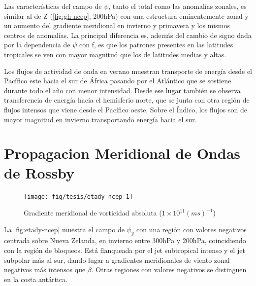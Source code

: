 \documentclass[spanish,a4paper,12pt,oneside]{book}
\begin{document}
Las características del campo de \(\psi\), tanto el total como las
anomalías zonales, es similar al de Z (\autoref{fig:gh-ncep}, 200hPa)
con una estructura eminentemente zonal y un aumento del gradiente
meridional en invierno y primavera y los mismos centros de anomalías. La
principal diferencia es, además del cambio de signo dada por la
dependencia de \(\psi\) con f, es que los patrones presentes en las
latitudes tropicales se ven con mayor magnitud que los de latitudes
medias y altas.

Los flujos de actividad de onda en verano muestran transporte de energía
desde el Pacífico este hacia el sur de África pasando por el Atlántico
que se sostiene durante todo el año con menor intensidad. Desde ese
lugar también se observa transferencia de energía hacia el hemisferio
norte, que se junta con otra región de flujos intensos que viene desde
el Pacífico oeste. Sobre el Índico, los flujos son de mayor magnitud en
invierno transportando energía hacia el sur.

\section{Propagacion Meridional de Ondas de
Rossby}\label{propagacion-meridional-de-ondas-de-rossby}

\begin{landscape}\begin{figure}

{\centering \texttt{[image: fig/tesis/etady-ncep-1]} 

}

\caption{Gradiente meridional de vorticidad absoluta ($1\times10^11(ms)^{-1}$)}\label{fig:etady-ncep}
\end{figure}
\end{landscape}

La \autoref{fig:etady-ncep} muestra el campo de \(\psi_y\) con una
región con valores negativos centrada sobre Nueva Zelanda, en invierno
entre 300hPa y 200hPa, coincidiendo con la región de bloqueos. Está
flanqueada por el jet subtropical intenso y el jet subpolar más al sur,
dando lugar a gradientes meridionales de viento zonal negativos más
intensos que \(\beta\). Otras regiones con valores negativos se
distinguen en la costa antártica.
\end{document}
